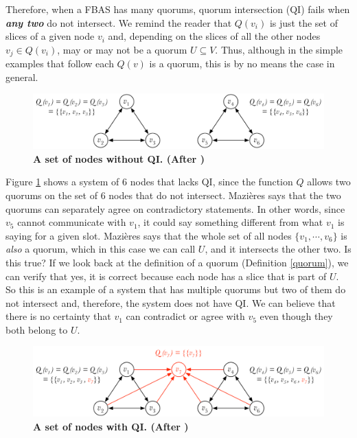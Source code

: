 Therefore, when a FBAS has many quorums, quorum intersection (QI) fails when \textbf{\textit{any two}} do not intersect. We remind the reader that $Q(v_i)$ is just the set of slices of a given node $v_i$ and, depending on the slices of all the other nodes $v_j \in Q(v_i)$, may or may not be a quorum $U \subseteq V$. Thus, although in the simple examples that follow each $Q(v)$ is a quorum, this is by no means the case in general.

\begin{figure}[h]
\centering
\includegraphics[width=15 cm]{Figures/QI1}
\caption{\bf \small A set of nodes without QI. (After \cite{Mazieres2016})}
\label{fig:QI1}
\end{figure}

Figure \ref{fig:QI1} shows a system of 6 nodes that lacks QI, since the function $Q$ allows two quorums on the set of 6 nodes that do not intersect. Mazi\`eres says that the two quorums can separately agree on contradictory statements. In other words, since $v_5$ cannot communicate with $v_1$, it could say something different from what $v_1$ is saying for a given slot. Mazi\`eres says that the whole set of all nodes $\{ v_1, \cdots, v_6 \}$ is \emph{also} a quorum, which in this case we can call $U$, and it intersects the other two. Is this true? If we look back at the definition of a quorum (Definition \ref{quorum}), we can verify that yes, it is correct because each node has a slice that is part of $U$. So this is an example of a system that has multiple quorums but two of them do not intersect and, therefore, the system does not have QI. We can believe that there is no certainty that $v_1$ can contradict or agree with $v_5$ even though they both belong to $U$.

\begin{figure}[h]
\centering
\includegraphics[width=15 cm]{Figures/QI2}
\caption{\bf \small A set of nodes with QI. (After \cite{Mazieres2016})}
\label{fig:QI2}
\end{figure}

